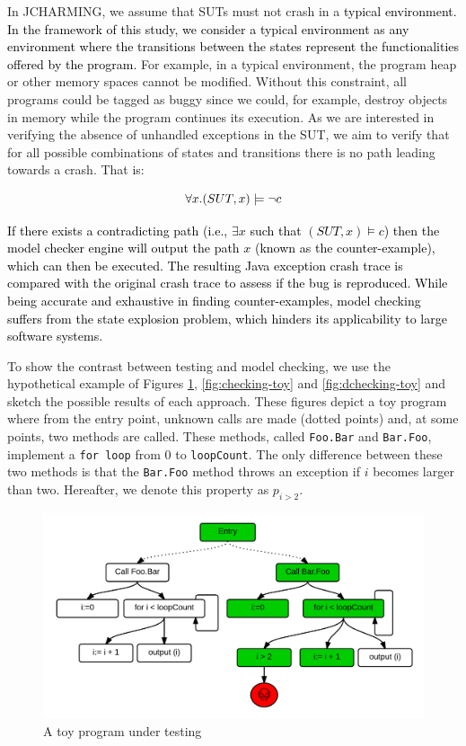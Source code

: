 \documentclass[times, doublespace]{smrauth}
\newcommand{\red}[1]{\textcolor{black}{#1}}
\begin{document}
In JCHARMING, we assume that SUTs
must not crash in a \red{typical environment.
In the framework of this study, we consider a typical environment
as any environment where the transitions between the states
represent the functionalities offered by the program.}
For example, in a typical environment, the program heap or other
memory spaces cannot be modified. Without this constraint,
all programs could be tagged as buggy since we could, for example,
destroy objects in memory while the program continues its execution.
As we are interested in verifying the absence of unhandled exceptions
in the SUT, we aim to verify that for all possible combinations of
states and transitions there is no path leading towards a crash. That is:

\begin{equation}
\red{\forall x.(SUT, x) \models \neg c}
\end{equation}

\red{If there exists a contradicting path (i.e., $\exists x$ such that $(SUT, x)
\models c$) then the model checker engine will output the path
$x$ (known as the counter-example), which can then be executed.
The resulting Java exception crash trace is compared with the original
crash trace to assess if the bug is reproduced.
While  being  accurate and exhaustive in finding counter-examples,
model checking suffers from the state explosion problem, which hinders
its applicability to large software systems.}


To show the contrast between testing and model checking, we use the hypothetical example of Figures \ref{fig:testing-toy}, \ref{fig:checking-toy} and \ref{fig:dchecking-toy} and sketch the possible results of each approach. These figures depict a toy program where from the entry point, unknown calls are made (dotted points) and, at some points, two methods are called. These methods, called \texttt{Foo.Bar} and \texttt{Bar.Foo}, implement a \texttt{for loop} from 0 to \texttt{loopCount}. The only difference between these two methods is that the \texttt{Bar.Foo} method throws an exception if $i$ becomes larger than two. Hereafter, we denote this property as $p_{i > 2}$.


\begin{figure}
  \centering
    \includegraphics[scale=0.7]{media/dmc.png}
    \caption{A toy program under testing
    \label{fig:testing-toy}}
\end{figure}
\end{document}
